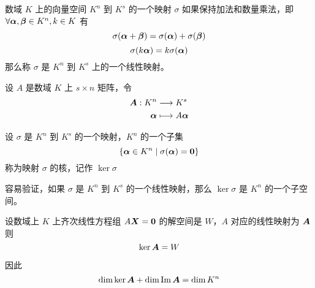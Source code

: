 \begin{definition}
    数域 $K$ 上的向量空间 $K^n$ 到 $K^s$ 的一个映射 $\sigma$ 如果保持加法和数量乘法，即 $\forall \boldsymbol{\alpha},\boldsymbol{\beta} \in K^n,k\in K$ 有
    $$\sigma (\boldsymbol{\alpha}+\boldsymbol{\beta}) = \sigma(\boldsymbol{\alpha}) + \sigma(\boldsymbol{\beta})$$
    $$\sigma(k\boldsymbol{\alpha}) = k\sigma(\boldsymbol{\alpha})$$
    那么称 $\sigma$ 是 $K^n$ 到 $K^s$ 上的一个线性映射。
\end{definition}

设 $A$ 是数域 $K$ 上 $s\times n$ 矩阵，令
\begin{equation*}
    \begin{aligned}
        \boldsymbol{A} : K^n &\longrightarrow K^s\\
        \boldsymbol{\alpha} &\longmapsto A\boldsymbol{\alpha}
    \end{aligned}
\end{equation*}


\begin{definition}
    设 $\sigma$ 是 $K^n$ 到 $K^s$ 的一个映射，$K^n$ 的一个子集
    $$\{\boldsymbol{\alpha} \in K^n \mid \sigma(\boldsymbol{\alpha}) = \boldsymbol{0}\}$$
    称为映射 $\sigma$ 的核，记作 $\ker \sigma$
\end{definition}

容易验证，如果 $\sigma$ 是 $K^n$ 到 $K^s$ 的一个线性映射，那么 $\ker \sigma$ 是 $K^n$ 的一个子空间。

\begin{theorem}
    设数域上 $K$ 上齐次线性方程组 $A\boldsymbol{X} = \boldsymbol{0}$ 的解空间是 $W$，$A$ 对应的线性映射为 $\boldsymbol{A}$ 则
    $$\ker \boldsymbol{A} = W$$
\end{theorem}

因此
$$\dim \ker \boldsymbol{A} + \dim \operatorname{Im} \boldsymbol{A} = \dim K^n$$

